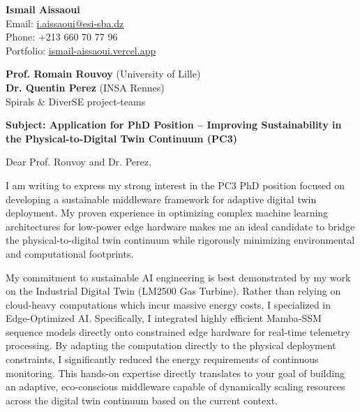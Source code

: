 \documentclass[11pt,a4paper]{article}
\begin{document}
\thispagestyle{empty}

\begin{flushright}
\textbf{Ismail Aissaoui} \\
Email: \href{mailto:i.aissaoui@esi-sba.dz}{i.aissaoui@esi-sba.dz} \\
Phone: +213 660 70 77 96 \\
Portfolio: \href{https://ismail-aissaoui.vercel.app}{ismail-aissaoui.vercel.app}
\end{flushright}

\vspace{1em}

\begin{flushleft}
\textbf{Prof. Romain Rouvoy} (University of Lille) \\
\textbf{Dr. Quentin Perez} (INSA Rennes) \\
Spirals \& DiverSE project-teams
\end{flushleft}

\vspace{1em}
\noindent\textbf{Subject: Application for PhD Position -- Improving Sustainability in the Physical-to-Digital Twin Continuum (PC3)}
\vspace{1em}

\noindent Dear Prof. Rouvoy and Dr. Perez,

\vspace{1em}
\noindent
I am writing to express my strong interest in the PC3 PhD position focused on developing a sustainable middleware framework for adaptive digital twin deployment. My proven experience in optimizing complex machine learning architectures for low-power edge hardware makes me an ideal candidate to bridge the physical-to-digital twin continuum while rigorously minimizing environmental and computational footprints.

\vspace{0.5em}
\noindent
My commitment to sustainable AI engineering is best demonstrated by my work on the Industrial Digital Twin (LM2500 Gas Turbine). Rather than relying on cloud-heavy computations which incur massive energy costs, I specialized in Edge-Optimized AI. Specifically, I integrated highly efficient Mamba-SSM sequence models directly onto constrained edge hardware for real-time telemetry processing. By adapting the computation directly to the physical deployment constraints, I significantly reduced the energy requirements of continuous monitoring. This hands-on expertise directly translates to your goal of building an adaptive, eco-conscious middleware capable of dynamically scaling resources across the digital twin continuum based on the current context.
\end{document}
